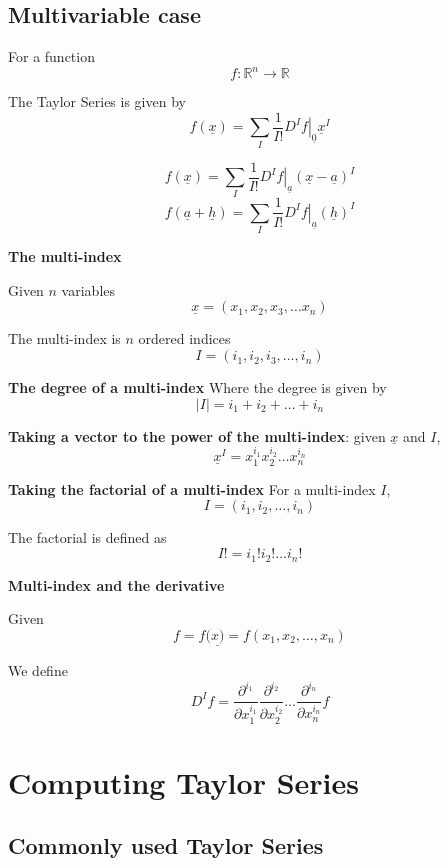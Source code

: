 \subsection{Multivariable case}

\begin{framed}
   For a function 
   \[
     f : \mathbb{R}^n \rightarrow \mathbb{R}
   \] 

   The Taylor Series is given by
   \[
      f( \underline{x}) = \sum_{I} \frac{1}{I!} \left. D^I f \right|_{ \underline{0}} \underline{x}^I
   \]  

   \[
      f (\underline{x}) = \sum_{I}  \frac{1}{I!} \left. D^I f  \right|_{ \underline{a} } ( \underline{x} - \underline{a})^I
   \] 
   \[
      f (\underline{a} + \underline{h}) = \sum_{I}  \frac{1}{I!} \left. D^I f  \right|_{ \underline{a} } ( \underline{h})^I
   \] 
\end{framed}

\textbf{The multi-index}

  Given $n$ variables
  \[
     \underline{x} = (x_1, x_2, x_3, \hdots x_n)
  \] 

  The multi-index is $n$ ordered indices
  \[
    I = (i_1, i_2, i_3, \hdots, i_n)
  \] 

\textbf{The degree of a multi-index}
  Where the degree is given by
  \[
    |I| = i_1+ i_2 + \hdots + i_n
  \] 

\textbf{Taking a vector to the power of the multi-index}: given $ \underline{x}$ and $I$, 
\[
  \underline{x}^I = x_1^{i_1}x_2^{i_2} \hdots x_{n}^{i_n}
\]


\textbf{Taking the factorial of a multi-index}
For a multi-index $ I$,
\[
  I = (i_1, i_2, \hdots, i_n)
\] 

The factorial is defined as
\[
   I! = i_1!  i_2 ! \hdots i_{n}!
\] 

\textbf{Multi-index and the derivative}

Given \[
  f = f( \underline{x)} = f(x_1, x_2, \hdots , x_n)
\] 

We define \[
   D^I f = \frac{\partial^{i_1} }{\partial x_1^{i_1}} \frac{\partial^{i_2} }{\partial x_2^{i_2}} \hdots \frac{\partial^{i_n} }{\partial x_n^{i_n}} f
\] 

\section{Computing Taylor Series}

\subsection{Commonly used Taylor Series}

